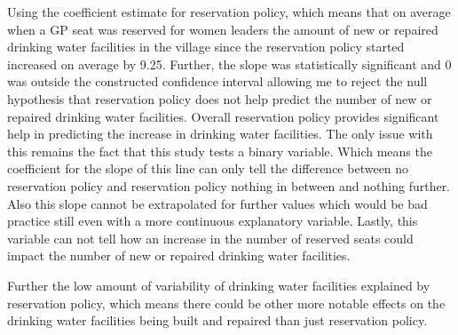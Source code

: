 \documentclass[12pt,letterpaper]{article}
\begin{document}
\begin{enumerate}
Using the coefficient estimate for reservation policy, which means that on average when a GP seat was reserved for women leaders the amount of new or repaired drinking water facilities in the village since the reservation policy started increased on average by 9.25.
Further, the slope was statistically significant and 0 was outside the constructed confidence interval allowing me to reject the null hypothesis that reservation policy does not help predict the number of new or repaired drinking water facilities. Overall reservation policy provides significant help in predicting the increase in drinking water facilities. The only issue with this remains the fact that this study tests a binary variable. Which means the coefficient for the slope of this line can only tell the difference between no reservation policy and reservation policy nothing in between and nothing further. Also this slope cannot be extrapolated for further values which would be bad practice still even with a more continuous explanatory variable. Lastly, this variable can not  tell how an increase in the number of reserved seats could impact the number of new or repaired drinking water facilities. 


Further the low amount of variability of drinking water facilities explained by reservation policy, which means there could be other more notable effects on the drinking water facilities being built and repaired than just reservation policy. 


\end{enumerate}


\end{document}
